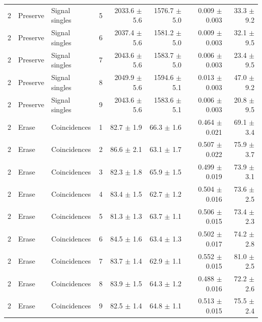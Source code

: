 \begin{tabular}{llllrrrr}
2 & Preserve & Signal singles & 5 & 2033.6 \ensuremath{\pm} 5.6 & 1576.7 \ensuremath{\pm} 5.0 & 0.009 \ensuremath{\pm} 0.003 & 33.3 \ensuremath{\pm} 9.2 \\
2 & Preserve & Signal singles & 6 & 2037.4 \ensuremath{\pm} 5.6 & 1581.2 \ensuremath{\pm} 5.0 & 0.009 \ensuremath{\pm} 0.003 & 32.1 \ensuremath{\pm} 9.5 \\
2 & Preserve & Signal singles & 7 & 2043.6 \ensuremath{\pm} 5.6 & 1583.7 \ensuremath{\pm} 5.0 & 0.006 \ensuremath{\pm} 0.003 & 23.4 \ensuremath{\pm} 9.5 \\
2 & Preserve & Signal singles & 8 & 2049.9 \ensuremath{\pm} 5.6 & 1594.6 \ensuremath{\pm} 5.1 & 0.013 \ensuremath{\pm} 0.003 & 47.0 \ensuremath{\pm} 9.2 \\
2 & Preserve & Signal singles & 9 & 2043.6 \ensuremath{\pm} 5.6 & 1583.6 \ensuremath{\pm} 5.1 & 0.006 \ensuremath{\pm} 0.003 & 20.8 \ensuremath{\pm} 9.5 \\
\midrule
2 & Erase & Coincidences & 1 & 82.7 \ensuremath{\pm} 1.9 & 66.3 \ensuremath{\pm} 1.6 & 0.464 \ensuremath{\pm} 0.021 & 69.1 \ensuremath{\pm} 3.4 \\
2 & Erase & Coincidences & 2 & 86.6 \ensuremath{\pm} 2.1 & 63.1 \ensuremath{\pm} 1.7 & 0.507 \ensuremath{\pm} 0.022 & 75.9 \ensuremath{\pm} 3.7 \\
2 & Erase & Coincidences & 3 & 82.3 \ensuremath{\pm} 1.8 & 65.9 \ensuremath{\pm} 1.5 & 0.499 \ensuremath{\pm} 0.019 & 73.9 \ensuremath{\pm} 3.1 \\
2 & Erase & Coincidences & 4 & 83.4 \ensuremath{\pm} 1.5 & 62.7 \ensuremath{\pm} 1.2 & 0.504 \ensuremath{\pm} 0.016 & 73.6 \ensuremath{\pm} 2.5 \\
2 & Erase & Coincidences & 5 & 81.3 \ensuremath{\pm} 1.3 & 63.7 \ensuremath{\pm} 1.1 & 0.506 \ensuremath{\pm} 0.015 & 73.4 \ensuremath{\pm} 2.3 \\
2 & Erase & Coincidences & 6 & 84.5 \ensuremath{\pm} 1.6 & 63.4 \ensuremath{\pm} 1.3 & 0.502 \ensuremath{\pm} 0.017 & 74.2 \ensuremath{\pm} 2.8 \\
2 & Erase & Coincidences & 7 & 83.7 \ensuremath{\pm} 1.4 & 62.9 \ensuremath{\pm} 1.1 & 0.552 \ensuremath{\pm} 0.015 & 81.0 \ensuremath{\pm} 2.5 \\
2 & Erase & Coincidences & 8 & 83.9 \ensuremath{\pm} 1.5 & 64.3 \ensuremath{\pm} 1.2 & 0.488 \ensuremath{\pm} 0.016 & 72.2 \ensuremath{\pm} 2.6 \\
2 & Erase & Coincidences & 9 & 82.5 \ensuremath{\pm} 1.4 & 64.8 \ensuremath{\pm} 1.1 & 0.513 \ensuremath{\pm} 0.015 & 75.5 \ensuremath{\pm} 2.4 \\

\end{tabular}
